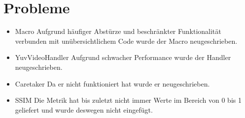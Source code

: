\chapter{Probleme}
\begin{itemize}
\item Macro \newline
Aufgrund häufiger Abstürze und beschränkter Funktionalität verbunden mit unübersichtlichem Code wurde der Macro neugeschrieben.
\item YuvVideoHandler \newline
Aufgrund schwacher Performance wurde der Handler neugeschrieben.
\item Caretaker \newline
Da er nicht funktioniert hat wurde er neugeschrieben.
\item SSIM \newline
Die Metrik hat bis zuletzt nicht immer Werte im Bereich von 0 bis 1 geliefert und wurde deswegen nicht eingefügt.
\end{itemize}